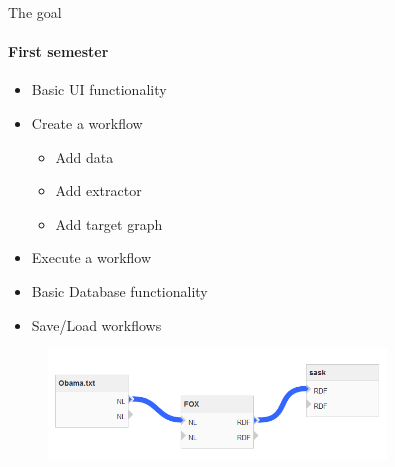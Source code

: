 \begin{frame}{The goal}
\framesubtitle{First semester}
	\begin{itemize}
		\item Basic UI functionality
		\item Create a workflow
		\begin{itemize}
			\item Add data
			\item Add extractor
			\item Add target graph
		\end{itemize}
		\item Execute a workflow
		\item Basic Database functionality
		\item Save/Load workflows
	\end{itemize}
	\begin{figure}[htbp]
  		\centering
  		\includegraphics[width=0.8\textwidth]{figures/workflow}
	\end{figure}
\end{frame}